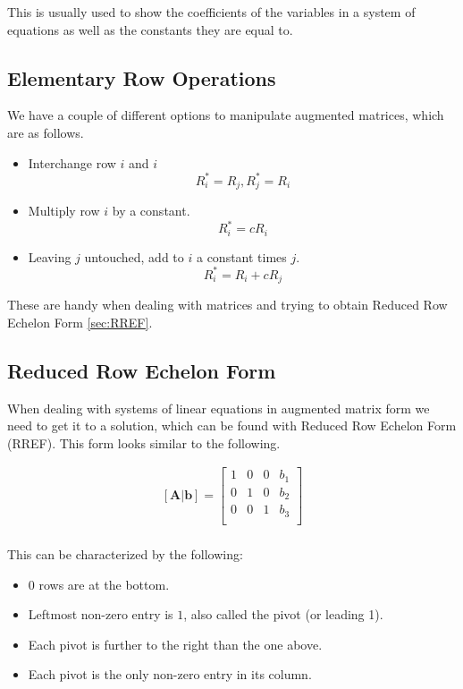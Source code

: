 \documentclass[12pt, landscape, twocolumn]{article}
\begin{document}
    This is usually used to show the coefficients of the variables in a system of equations as well as the constants they are equal to.

    \subsection{Elementary Row Operations}
    We have a couple of different options to manipulate augmented matrices, which are as follows.

    \begin{itemize}
        \item Interchange row $i$ and $i$
            \[ R^*_i = R_j, R^*_j = R_i \]
        \item Multiply row $i$ by a constant.
            \[ R^*_i = cR_i \]
        \item Leaving $j$ untouched, add to $i$ a constant times $j$.
            \[ R^*_i = R_i + cR_j \]
    \end{itemize}

    These are handy when dealing with matrices and trying to obtain Reduced Row Echelon Form \eqref{sec:RREF}.

    \subsection{Reduced Row Echelon Form}\label{sec:RREF}
    When dealing with systems of linear equations in augmented matrix form we need to get it to a solution, which can be found with Reduced Row Echelon Form (RREF). This form looks similar to the following.

    \begin{equation}\label{eq:rref}
    \begin{aligned}
        \mathbf{[A|b]}=
        \left[\begin{array}{ccc|c}
        1 & 0 & 0 & b_1\\
        0 & 1 & 0 & b_2\\
        0 & 0 & 1 & b_3\\
        \end{array}\right]\\
    \end{aligned}
    \end{equation}

    This can be characterized by the following:

    \begin{itemize}
        \item $0$ rows are at the bottom.
        \item Leftmost non-zero entry is $1$, also called the pivot (or leading 1).
        \item Each pivot is further to the right than the one above.
        \item Each pivot is the only non-zero entry in its column.
    \end{itemize}
\end{document}
